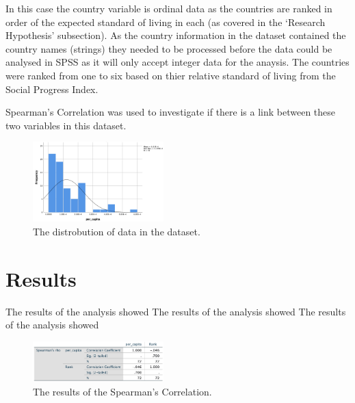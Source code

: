 \documentclass[conference]{IEEEtran}
\begin{document}
In this case the country variable is ordinal data as the countries are ranked in order of the expected standard of living in each (as covered in the `Research Hypothesis' subsection).
As the country information in the dataset contained the country names (strings) they needed to be processed before the data could be analysed in SPSS as it will only accept integer data for the anaysis.
The countries were ranked from one to six based on thier relative standard of living from the Social Progress Index.

Spearman's Correlation was used to investigate if there is a link between these two variables in this dataset.

    \begin{figure}[b]
        \centering
        \includegraphics[width=0.45\textwidth]{skewed}
        \caption{The distrobution of data in the dataset.}
    \end{figure}

\section{Results}
The results of the analysis showed The results of the analysis showed The results of the analysis showed
\newline

\begin{figure}[b]
    \centering
    \includegraphics[width=0.45\textwidth]{spearmans}
    \caption{The results of the Spearman's Correlation.}
\end{figure}
\end{document}
